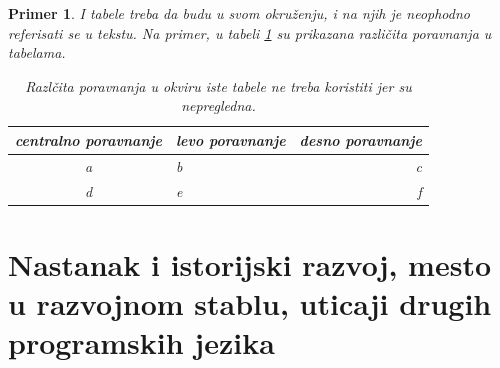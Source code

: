 \documentclass[a4paper]{article}
\newtheorem{primer}{Primer}[section]
\begin{document}
{\begin{primer} I tabele treba da budu u svom okruženju, i na njih je neophodno referisati se u tekstu. Na primer, u tabeli \ref{tab:tabela1} su prikazana različita poravnanja u tabelama.

\begin{table}[h!]
\begin{center}
\caption{Razlčita poravnanja u okviru iste tabele ne treba koristiti jer su nepregledna.}
\begin{tabular}{|c|l|r|} \hline
centralno poravnanje& levo poravnanje& desno poravnanje\\ \hline
a &b&c\\ \hline
d &e&f\\ \hline
\end{tabular}
\label{tab:tabela1}
\end{center}
\end{table}

\end{primer}

\section{Nastanak i istorijski razvoj, mesto u razvojnom stablu, uticaji drugih programskih jezika}
\label{sec:osnovno}

}
\end{document}
